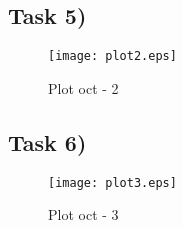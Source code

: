 \subsection{Task 5)}
\label{subsec:task5_a}


\begin{figure}[ht]
	\centering
	\texttt{[image: plot2.eps]}
	\caption{Plot oct - 2}
\label{fig:Dsnh_sim_t2}
\end{figure}

\subsection{Task 6)}
\label{subsec:task6_a}

\begin{figure}[ht]
	\centering
	\texttt{[image: plot3.eps]}
	\caption{Plot oct - 3}
\label{fig:Dsnh_sim_t2}
\end{figure}



